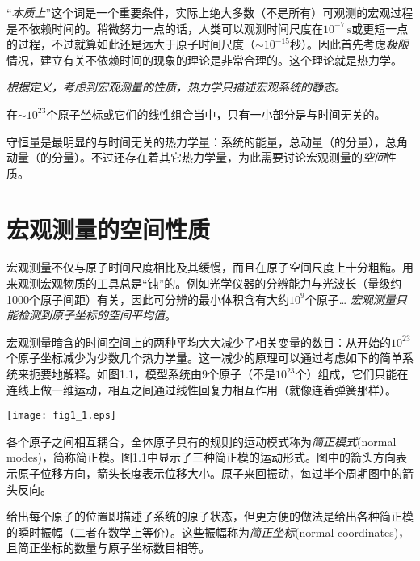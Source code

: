 “{\it 本质上}”这个词是一个重要条件，实际上绝大多数（不是所有）可观测的宏观过程是不依赖时间的。稍微努力一点的话，人类可以观测时间尺度在$10^{-7}\, \mathrm{s}$或更短一点的过程，不过就算如此还是远大于原子时间尺度（$\sim 10^{-15}$秒）。因此首先考虑{\it 极限}情况，建立有关不依赖时间的现象的理论是非常合理的。这个理论就是热力学。

{\it 根据定义，考虑到宏观测量的性质，热力学只描述宏观系统的静态。}

在$\sim 10^{23}$个原子坐标或它们的线性组合当中，只有一小部分是与时间无关的。

守恒量是最明显的与时间无关的热力学量：系统的能量，总动量（的分量），总角动量（的分量）。不过还存在着其它热力学量，为此需要讨论宏观测量的{\it 空间}性质。

\section{宏观测量的空间性质}
\label{sec1.2}
宏观测量不仅与原子时间尺度相比及其缓慢，而且在原子空间尺度上十分粗糙。用来观测宏观物质的工具总是“钝”的。例如光学仪器的分辨能力与光波长（量级约1000个原子间距）有关，因此可分辨的最小体积含有大约$10^9$个原子… {\it 宏观测量只能检测到原子坐标的空间平均值}。

宏观测量暗含的时间空间上的两种平均大大减少了相关变量的数目：从开始的$10^{23}$个原子坐标减少为少数几个热力学量。这一减少的原理可以通过考虑如下的简单系统来扼要地解释。如图1.1，模型系统由9个原子（不是$10^{23}$个）组成，它们只能在连线上做一维运动，相互之间通过线性回复力相互作用（就像连着弹簧那样）。

{
	\centering
	\texttt{[image: fig1\_1.eps]} 
}

各个原子之间相互耦合，全体原子具有的规则的运动模式称为{\it 简正模式}(normal modes)，简称简正模。图1.1中显示了三种简正模的运动形式。图中的箭头方向表示原子位移方向，箭头长度表示位移大小。原子来回振动，每过半个周期图中的箭头反向。

给出每个原子的位置即描述了系统的原子状态，但更方便的做法是给出各种简正模的瞬时振幅（二者在数学上等价）。这些振幅称为{\it 简正坐标}(normal coordinates)，且简正坐标的数量与原子坐标数目相等。

